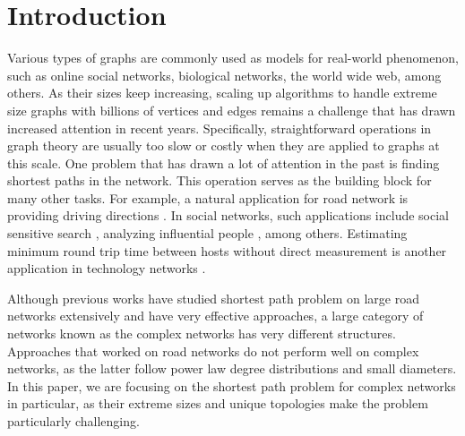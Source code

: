 \section{Introduction}
\label{introduction}

Various types of graphs are commonly used as models for real-world phenomenon, such as online social networks, biological networks, the world wide web, among others. As their sizes keep increasing, scaling up algorithms to handle extreme size graphs with billions of vertices and edges remains a challenge that has drawn increased attention in recent years. Specifically, straightforward operations in graph theory are usually too slow or costly when they are applied to graphs at this scale. One problem that has drawn a lot of attention in the past is finding shortest paths in the network. This operation serves as the building block for many other tasks. For example, a natural application for road network is providing driving directions \cite{Abraham:2011:HLA:2008623.2008645}. In social networks, such applications include social sensitive search \cite{Vieira:2007:ESR:1321440.1321520}, analyzing influential people \cite{Kempe:2003:MSI:956750.956769}, among others. Estimating minimum round trip time between hosts without direct measurement is another application in technology networks \cite{Tang:2003:VLI:948205.948223}.

Although previous works have studied shortest path problem on large road networks extensively and have very effective approaches, a large category of networks known as the complex networks has very different structures. Approaches that worked on road networks do not perform well on complex networks, as the latter follow power law degree distributions and small diameters. In this paper, we are focusing on the shortest path problem for complex networks in particular, as their extreme sizes and unique topologies make the problem particularly challenging.


